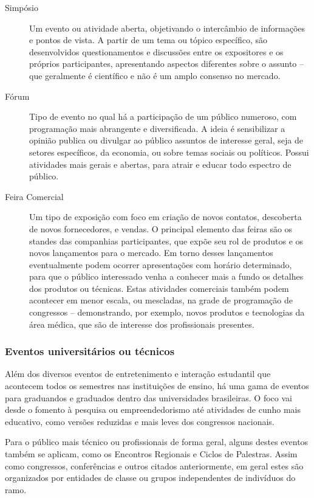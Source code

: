 \documentclass[12pt,a4paper,twoside,hyphens,english,brazil]{abntex2}
\begin{document}
\begin{description}
	\item[Simpósio] Um evento ou atividade aberta, objetivando o intercâmbio de informações e pontos de vista. A partir de um tema ou tópico específico, são desenvolvidos questionamentos e discussões entre os expositores e os próprios participantes, apresentando aspectos diferentes sobre o assunto -- que geralmente é científico e não é um amplo consenso no mercado. %
	
	\item[Fórum] Tipo de evento no qual há a participação de um público numeroso, com programação mais abrangente e diversificada. A ideia é sensibilizar a opinião publica ou divulgar ao público assuntos de interesse geral, seja de setores específicos, da economia, ou sobre temas sociais ou políticos. Possui atividades mais gerais e abertas, para atrair e educar todo espectro de público.
	
	\item[Feira Comercial] Um tipo de exposição com foco em criação de novos contatos, descoberta de novos fornecedores, e vendas. O principal elemento das feiras são os standes das companhias participantes, que expõe seu rol de produtos e os novos lançamentos para o mercado. Em torno desses lançamentos eventualmente podem ocorrer apresentações com horário determinado, para que o público interessado venha a conhecer mais a fundo os detalhes dos produtos ou técnicas. Estas atividades comerciais também podem acontecer em menor escala, ou mescladas, na grade de programação de congressos -- demonstrando, por exemplo, novos produtos e tecnologias da área médica, que são de interesse dos profissionais presentes.
\end{description}

\subsubsection*{Eventos universitários ou técnicos}

Além dos diversos eventos de entretenimento e interação estudantil que acontecem todos os semestres nas instituições de ensino, há uma gama de eventos para graduandos e graduados dentro das universidades brasileiras. O foco vai desde o fomento à pesquisa ou empreendedorismo até atividades de cunho mais educativo, como versões reduzidas e mais leves dos congressos nacionais.

Para o público mais técnico ou profissionais de forma geral, alguns destes eventos também se aplicam, como os Encontros Regionais e Ciclos de Palestras. Assim como congressos, conferências e outros citados anteriormente, em geral estes são organizados por entidades de classe ou grupos independentes de indivíduos do ramo.
\end{document}
